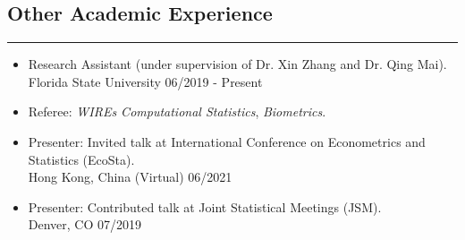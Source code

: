 \documentclass[10pt, oneside]{article}
\begin{document}
\subsection*{Other Academic Experience}
\noindent\rule{\textwidth}{1pt}
\begin{itemize}[itemsep=-1pt]
    \item Research Assistant (under supervision of Dr. Xin Zhang and Dr. Qing Mai). \\
    Florida State University \hfill 06/2019 - Present
    \item Referee: \textit{WIREs Computational Statistics}, \textit{Biometrics}.
    \item Presenter: Invited talk at International Conference on Econometrics and Statistics (EcoSta).\\
    Hong Kong, China (Virtual) \hfill 06/2021
    \item Presenter: Contributed talk at Joint Statistical Meetings (JSM).\\
    Denver, CO \hfill 07/2019


\end{itemize}


\end{document}
